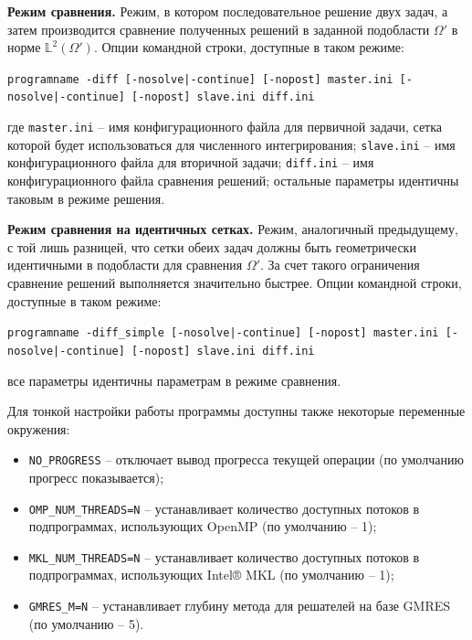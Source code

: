\documentclass[a4paper,14pt]{article}
\newcommand{\CodeFont}[1]{{\small{\texttt{#1}}}}
\begin{document}
\textbf{Режим сравнения.} Режим, в котором последовательное решение двух задач, а затем производится сравнение полученных решений в заданной подобласти $\Omega'$ в норме $\mathbb{L}^{2}(\Omega')$. Опции командной строки, доступные в таком режиме:

\CodeFont{programname -diff [-nosolve|-continue] [-nopost] master.ini [-nosolve|-continue] [-nopost] slave.ini diff.ini}

\noindent где \CodeFont{master.ini} -- имя конфигурационного файла для первичной задачи, сетка которой будет использоваться для численного интегрирования; \CodeFont{slave.ini} -- имя конфигурационного файла для вторичной задачи; \CodeFont{diff.ini} -- имя конфигурационного файла сравнения решений; остальные параметры идентичны таковым в режиме решения.

\textbf{Режим сравнения на идентичных сетках.} Режим, аналогичный предыдущему, с той лишь разницей, что сетки обеих задач должны быть геометрически идентичными в подобласти для сравнения $\Omega'$. За счет такого ограничения сравнение решений выполняется значительно быстрее. Опции командной строки, доступные в таком режиме:

\CodeFont{programname -diff\_simple [-nosolve|-continue] [-nopost] master.ini [-nosolve|-continue] [-nopost] slave.ini diff.ini}

\noindent все параметры идентичны параметрам в режиме сравнения.

Для тонкой настройки работы программы доступны также некоторые переменные окружения:
\begin{itemize}
	\item \CodeFont{NO\_PROGRESS} -- отключает вывод прогресса текущей операции (по умолчанию прогресс показывается);
	\item \CodeFont{OMP\_NUM\_THREADS=N} -- устанавливает количество доступных потоков в подпрограммах, использующих OpenMP (по умолчанию -- 1);
	\item \CodeFont{MKL\_NUM\_THREADS=N} -- устанавливает количество доступных потоков в подпрограммах, использующих Intel® MKL (по умолчанию -- 1);
	\item \CodeFont{GMRES\_M=N} -- устанавливает глубину метода для решателей на базе GMRES (по умолчанию -- 5).
\end{itemize}
\end{document}
